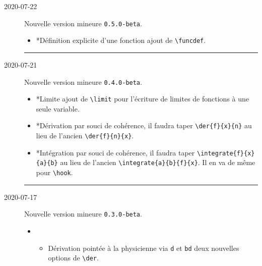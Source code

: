 \documentclass[12pt,a4paper]{article}
\makeatletter
\newcommand\env[1]{\texttt{#1}}
\newcommand\macro[1]{\env{\textbackslash{}#1}}
\theoremstyle{definition}
\newcommand\separation{
	\medskip
	\hfill\rule{0.5\textwidth}{0.75pt}\hfill
	\medskip
}
\newcommand\topic{\@ifstar{\@topic@star}{\@topic@no@star}}
\newcommand\@topic@no@star[1]{%
	\textbf{\textsc{#1}.}%
}
\newcommand\@topic@star[1]{%
	\textbf{\textsc{#1} :}%
}
\makeatother
\begin{document}
\begin{description}

    \medskip
    \item[2020-07-22] Nouvelle version mineure \verb+0.5.0-beta+.
    
    \begin{itemize}[itemsep=.5em]
        \item \topic*{Définition explicite d'une fonction}
              ajout de \macro{funcdef}.
    \end{itemize}
    
    \separation

    \medskip
    \item[2020-07-21] Nouvelle version mineure \verb+0.4.0-beta+.
    
    \begin{itemize}[itemsep=.5em]
        \item \topic*{Limite}
              ajout de \macro{limit} pour l'écriture de limites de fonctions à une seule variable.
    
    
        \item \topic*{Dérivation}
              par souci de cohérence, il faudra taper \verb#\der{f}{x}{n}# au lieu de l'ancien \verb#\der{f}{n}{x}#.
    
    
        \item \topic*{Intégration}
              par souci de cohérence, il faudra taper \verb#\integrate{f}{x}{a}{b}# au lieu de l'ancien \verb#\integrate{a}{b}{f}{x}#.
              Il en va de même pour \macro{hook}.
    \end{itemize}
    
    \separation


    \medskip
    \item[2020-07-17] Nouvelle version mineure \verb+0.3.0-beta+.
    
    \begin{itemize}[itemsep=.5em]
        \item \topic{Dérivation}
        \begin{itemize}[itemsep=.5em]
            \item Dérivation pointée à la physicienne via \verb+d+ et \verb+bd+ deux nouvelles options de \macro{der}.
    

\end{itemize}
\end{itemize}
\end{description}
\end{document}
